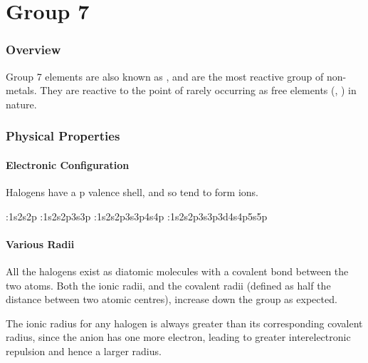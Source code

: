 

\pagebreak
\part{Group 7}

	\section{Overview}

		Group 7 elements are also known as , and are the most reactive group of non-metals.
		They are reactive to the point of rarely occurring as free elements (, ) in nature.


	\section{Physical Properties}

		\subsection{Electronic Configuration}

			Halogens have a p valence shell, and so tend to form  ions.


			\tabto{0mm}:\tabto{10mm}1s\sps{2}2s2p
			\tabto{0mm}\ch{\Cl}:\tabto{10mm}1s\sps{2}2s2p3s3p
			\tabto{0mm}:\tabto{10mm}1s\sps{2}2s2p3s3p4s4p
			\tabto{0mm}:\tabto{10mm}1s\sps{2}2s2p3s3p3d4s4p5s5p



		\subsection{Various Radii}

			All the halogens exist as diatomic molecules with a covalent bond between the two atoms. Both the ionic radii, and the covalent
			radii (defined as half the distance between two atomic centres), increase down the group as expected.

			The ionic radius for any halogen is always greater than its corresponding covalent radius, since the anion has one more electron,
			leading to greater interelectronic repulsion and hence a larger radius.


